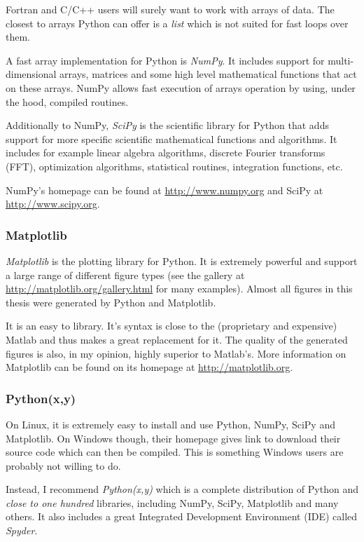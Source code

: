 Fortran and C/C++ users will surely want to work with arrays of data. The closest
to arrays Python can offer is a \textit{list} which is not suited for fast
loops over them.

A fast array implementation for Python is \textit{NumPy}. It includes support
for multi-dimensional arrays, matrices and some high level mathematical functions
that act on these arrays. NumPy allows fast execution of arrays operation by
using, under the hood, compiled routines.

Additionally to NumPy, \textit{SciPy} is the scientific library for Python that
adds support for more specific scientific mathematical functions and algorithms.
It includes for example linear algebra algorithms, discrete Fourier transforms
(FFT), optimization algorithms, statistical routines, integration functions, etc.

NumPy's homepage can be found at \url{http://www.numpy.org} and SciPy at\\
\url{http://www.scipy.org}.


\subsubsection*{Matplotlib}

\textit{Matplotlib}\cite{matplotlib} is the plotting library for Python. It is extremely powerful
and support a large range of different figure types (see the gallery
at \url{http://matplotlib.org/gallery.html} for
many examples). Almost all figures in
this thesis were generated by Python and Matplotlib.

It is an easy to library. It's syntax is close to the (proprietary and expensive)
Matlab and thus makes a great replacement for it. The quality of the generated
figures is also, in my opinion, highly superior to Matlab's.
More information on Matplotlib can be found on its homepage at
\url{http://matplotlib.org}.


\subsubsection*{Python(x,y)}

On Linux, it is extremely easy to install and use Python, NumPy, SciPy and
Matplotlib. On Windows though, their homepage gives link to download their
source code which can then be compiled. This is something Windows users are
probably not willing to do.

Instead, I recommend \textit{Python(x,y)} which is a complete distribution of
Python and \textit{close to one hundred} libraries, including NumPy, SciPy,
Matplotlib and many others. It also includes a great Integrated Development
Environment (IDE) called \textit{Spyder}.

